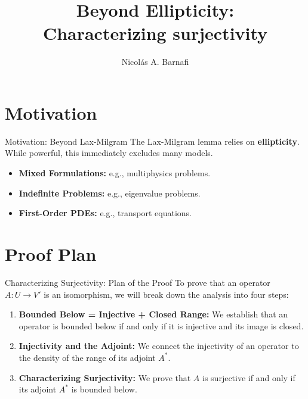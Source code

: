 \documentclass[aspectratio=169]{beamer}
\title[Finite Elements I]{Beyond Ellipticity: \\ Characterizing surjectivity}
\author{Nicol\'as A. Barnafi}
\date{}
\begin{document}
\begin{frame}
    \titlepage
\end{frame}

\section{Motivation}

\begin{frame}{Motivation: Beyond Lax-Milgram}
    The Lax-Milgram lemma relies  on \textbf{ellipticity}. While powerful, this immediately excludes many models.
    
    \begin{itemize}
        \item \textbf{Mixed Formulations:} e.g., multiphysics problems.
        \item \textbf{Indefinite Problems:} e.g., eigenvalue problems.
        \item \textbf{First-Order PDEs:} e.g., transport equations.
    \end{itemize}
    
    \vspace{0.2cm}
\end{frame}

\section{Proof Plan}

\begin{frame}{Characterizing Surjectivity: Plan of the Proof}
    To prove that an operator $A: U \to V'$ is an isomorphism, we will break down the  analysis into four  steps:
    
    \vspace{0.3cm}
    \begin{enumerate}
        \item \textbf{Bounded Below = Injective + Closed Range:} We establish that an operator is bounded below if and only if it is injective and its image is closed.
        \item \textbf{Injectivity and the Adjoint:} We connect the injectivity of an operator to the density of the range of its adjoint $A^*$.
        \item \textbf{Characterizing Surjectivity:} We prove that $A$ is surjective if and only if its adjoint $A^*$ is bounded below.
    \end{enumerate}
\end{frame}
\end{document}
